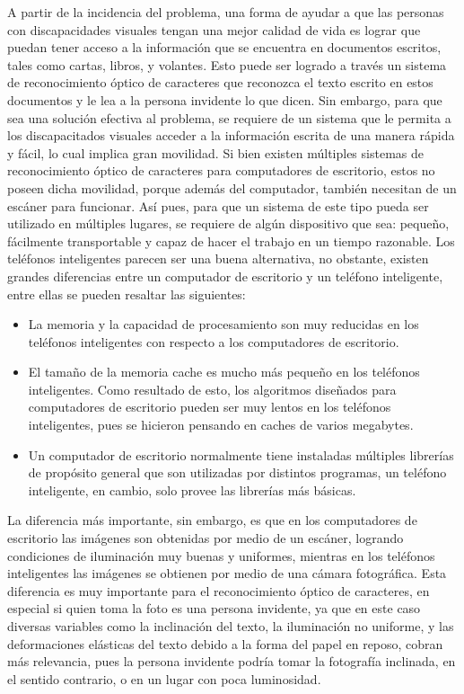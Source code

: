 \documentclass[a4paper, 11pt, oneside]{report}
\begin{document}
A partir de la incidencia del problema, una forma de ayudar a que las personas con discapacidades visuales tengan una mejor calidad de vida es lograr que puedan tener acceso a la información que se encuentra en documentos escritos, tales como cartas, libros, y volantes. Esto puede ser logrado a través un sistema de reconocimiento óptico de caracteres que reconozca el texto escrito en estos documentos y le lea a la persona invidente lo que dicen. Sin embargo, para que sea una solución efectiva al problema, se requiere de un sistema que le permita a los discapacitados visuales acceder a la información escrita de una manera rápida y fácil, lo cual implica gran movilidad. Si bien existen múltiples sistemas de reconocimiento óptico de caracteres para computadores de escritorio, estos no poseen dicha movilidad, porque además del computador, también necesitan de un escáner para funcionar. Así pues, para que un sistema de este tipo pueda ser utilizado en múltiples lugares, se requiere de algún dispositivo que sea: pequeño, fácilmente transportable y capaz de hacer el trabajo en un tiempo razonable. Los teléfonos inteligentes parecen ser una buena alternativa, no obstante, existen grandes diferencias entre un computador de escritorio y un teléfono inteligente, entre ellas se pueden resaltar las siguientes:

\begin{itemize}

\item La memoria y la capacidad de procesamiento son muy reducidas en los teléfonos inteligentes con respecto a los computadores de escritorio.

\item El tamaño de la memoria cache es mucho más pequeño en los teléfonos inteligentes. Como resultado de esto, los algoritmos diseñados para computadores de escritorio pueden ser muy lentos en los teléfonos inteligentes, pues se hicieron pensando en caches de varios megabytes.

\item Un computador de escritorio normalmente tiene instaladas múltiples librerías de propósito general que son utilizadas por distintos programas, un teléfono inteligente, en cambio, solo provee las librerías más básicas.

\end{itemize}

La diferencia más importante, sin embargo, es que en los computadores de escritorio las imágenes son obtenidas por medio de un escáner, logrando condiciones de iluminación muy buenas y uniformes, mientras en los teléfonos inteligentes las imágenes se obtienen por medio de una cámara fotográfica. Esta diferencia es muy importante para el reconocimiento óptico de caracteres, en especial si quien toma la foto es una persona invidente, ya que en este caso diversas variables como la inclinación del texto, la iluminación no uniforme, y las deformaciones elásticas del texto debido a la forma del papel en reposo, cobran más relevancia, pues la persona invidente podría tomar la fotografía inclinada, en el sentido contrario, o en un lugar con poca luminosidad.
\end{document}
